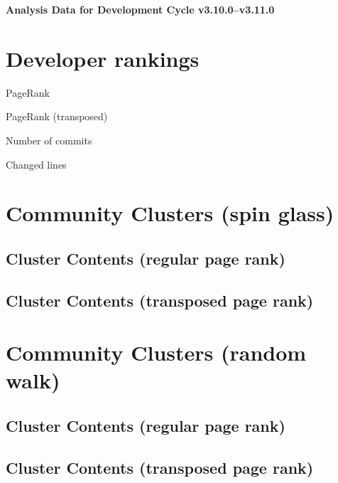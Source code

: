 \documentclass{article}
\begin{document}
\setlength{\parindent}{0pt}
\begin{center}
\begin{Large}
\textbf{Analysis Data for Development Cycle v3.10.0--v3.11.0}
\end{Large}
\end{center}
\section{Developer rankings}
\begin{small}\renewcommand{\tabcolsep}{1pt}
\begin{minipage}{0.5\linewidth}
PageRank\\

\end{minipage}%
\begin{minipage}{0.5\linewidth}
PageRank (transposed)\\

\end{minipage}

\renewcommand{\tabcolsep}{5pt}
\begin{minipage}{0.5\linewidth}
Number of commits\\

\end{minipage}%
\begin{minipage}{0.5\linewidth}
Changed lines\\

\end{minipage}
\end{small}
\newpage\section{Community Clusters (spin glass)}
\subsection{Cluster Contents (regular page rank)}
\newpage\subsection{Cluster Contents (transposed page rank)}
\newpage\section{Community Clusters (random walk)}
\subsection{Cluster Contents (regular page rank)}
\newpage\subsection{Cluster Contents (transposed page rank)}
\end{document}
